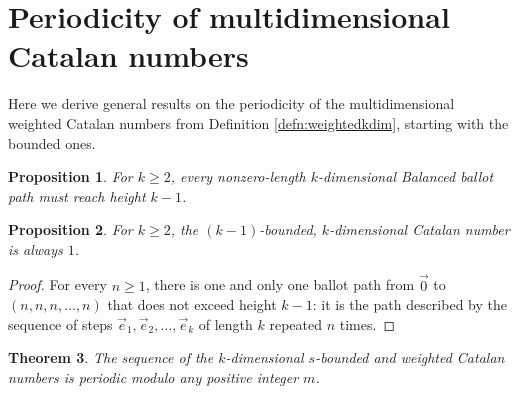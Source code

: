 \documentclass[12pt,notitlepage]{amsart}
\numberwithin{equation}{section}
\theoremstyle{thmstyleone}%
\newtheorem{theorem}{Theorem}[section]%
\newtheorem{proposition}[theorem]{Proposition}%
\theoremstyle{thmstyletwo}%
\theoremstyle{thmstylethree}%
\numberwithin{theorem}{section}
\numberwithin{equation}{section}
\begin{document}

\section{Periodicity of multidimensional Catalan numbers}\label{sec:periodicity}
Here we derive general results on the periodicity of the multidimensional weighted Catalan numbers from Definition \ref{defn:weightedkdim}, starting with the bounded ones.
\begin{proposition}
    For $k \geq 2$, every nonzero-length $k$-dimensional Balanced ballot path must reach height $k-1$.
\end{proposition}

\begin{proposition}
    For $k \geq 2$, the $(k-1)$-bounded, $k$-dimensional Catalan number is always $1$.
\end{proposition}\begin{proof}
    For every $n \geq 1$, there is one and only one ballot path from $\vec{0}$ to $(n, n, n, \dots, n)$ that does not exceed height $k-1$: it is the path described by the sequence of steps $\vec{e}_1, \vec{e}_2, \dots, \vec{e}_k$ of length $k$ repeated $n$ times.
\end{proof}
\begin{theorem}
\label{thm:periodboundedkdim}
    The sequence of the $k$-dimensional $s$-bounded and weighted Catalan numbers is periodic modulo any positive integer $m$.
\end{theorem}
\end{document}
